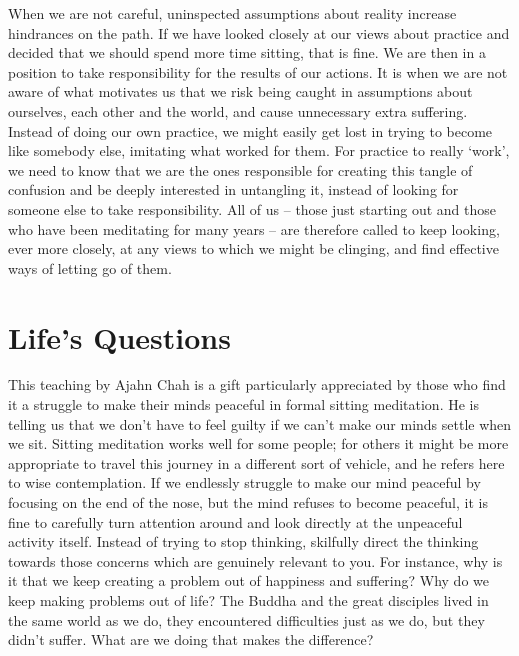 When we are not careful, uninspected assumptions about reality increase
hindrances on the path. If we have looked closely at our views about
practice and decided that we should spend more time sitting, that is
fine. We are then in a position to take responsibility for the results
of our actions. It is when we are not aware of what motivates us that we
risk being caught in assumptions about ourselves, each other and the
world, and cause unnecessary extra suffering. Instead of doing our own
practice, we might easily get lost in trying to become like somebody
else, imitating what worked for them. For practice to really ‘work’, we
need to know that we are the ones responsible for creating this tangle
of confusion and be deeply interested in untangling it, instead of
looking for someone else to take responsibility. All of us – those just
starting out and those who have been meditating for many years – are
therefore called to keep looking, ever more closely, at any views to
which we might be clinging, and find effective ways of letting go of
them.

\section{Life's Questions}

This teaching by Ajahn Chah is a gift particularly appreciated by those
who find it a struggle to make their minds peaceful in formal sitting
meditation. He is telling us that we don’t have to feel guilty if we
can’t make our minds settle when we sit. Sitting meditation works well
for some people; for others it might be more appropriate to travel this
journey in a different sort of vehicle, and he refers here to wise
contemplation. If we endlessly struggle to make our mind peaceful by
focusing on the end of the nose, but the mind refuses to become
peaceful, it is fine to carefully turn attention around and look
directly at the unpeaceful activity itself. Instead of trying to stop
thinking, skilfully direct the thinking towards those concerns which are
genuinely relevant to you. For instance, why is it that we keep creating
a problem out of happiness and suffering? Why do we keep making problems
out of life? The Buddha and the great disciples lived in the same world
as we do, they encountered difficulties just as we do, but they didn’t
suffer. What are we doing that makes the difference?

